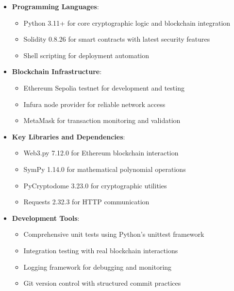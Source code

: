 \documentclass[12pt,a4paper]{article}
\begin{document}
\begin{itemize}[leftmargin=15pt]
    \item \textbf{Programming Languages}:
    \begin{itemize}
        \item Python 3.11+ for core cryptographic logic and blockchain integration
        \item Solidity 0.8.26 for smart contracts with latest security features
        \item Shell scripting for deployment automation
    \end{itemize}
    
    \item \textbf{Blockchain Infrastructure}:
    \begin{itemize}
        \item Ethereum Sepolia testnet for development and testing
        \item Infura node provider for reliable network access
        \item MetaMask for transaction monitoring and validation
    \end{itemize}
    
    \item \textbf{Key Libraries and Dependencies}:
    \begin{itemize}
        \item Web3.py 7.12.0 for Ethereum blockchain interaction
        \item SymPy 1.14.0 for mathematical polynomial operations
        \item PyCryptodome 3.23.0 for cryptographic utilities
        \item Requests 2.32.3 for HTTP communication
    \end{itemize}
    
    \item \textbf{Development Tools}:
    \begin{itemize}
        \item Comprehensive unit tests using Python's unittest framework
        \item Integration testing with real blockchain interactions
        \item Logging framework for debugging and monitoring
        \item Git version control with structured commit practices
    \end{itemize}
\end{itemize}
\end{document}
